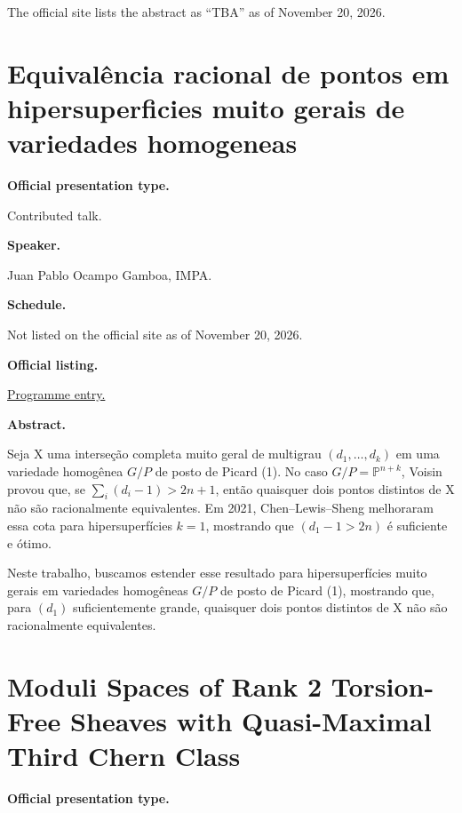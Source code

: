 The official site lists the abstract
as ``TBA'' as of November 20, 2026.

\section{Equivalência racional de pontos em
hipersuperficies muito gerais de variedades
homogeneas}
\label{section-equivalencia-racional-de}

\medskip\noindent
{\bf Official presentation type.}

Contributed talk.

\medskip\noindent
{\bf Speaker.}

Juan Pablo Ocampo Gamboa, IMPA.

\medskip\noindent
{\bf Schedule.}

Not listed on the official site as of
November 20, 2026.

\medskip\noindent
{\bf Official listing.}

\href{%
https://sites.google.com/view/%
geoalgcompluff/legal/%
legal-2027-resumos#h.dant8g3oe5ea%
}{Programme entry.}

\medskip\noindent
{\bf Abstract.}

Seja X uma interseção completa muito geral de
multigrau $(d_1,\ldots,d_k)$ em uma variedade
homogênea $G/P$ de posto de Picard (1). No
caso $G/P=\mathbb{P}^{n+k}$, Voisin provou
que, se $\sum_i(d_i-1)>2n+1$, então quaisquer
dois pontos distintos de X não são
racionalmente equivalentes. Em 2021,
Chen–Lewis–Sheng melhoraram essa cota para
hipersuperfícies $k=1$, mostrando que
$(d_1-1>2n)$ é suficiente e ótimo.

Neste trabalho, buscamos estender esse
resultado para hipersuperfícies muito gerais
em variedades homogêneas $G/P$ de posto de
Picard (1), mostrando que, para $(d_1)$
suficientemente grande, quaisquer dois pontos
distintos de X não são racionalmente
equivalentes.

\section{Moduli Spaces of Rank 2 Torsion-Free
Sheaves with Quasi-Maximal Third Chern Class}
\label{section-moduli-spaces-of-rank-2}

\medskip\noindent
{\bf Official presentation type.}

